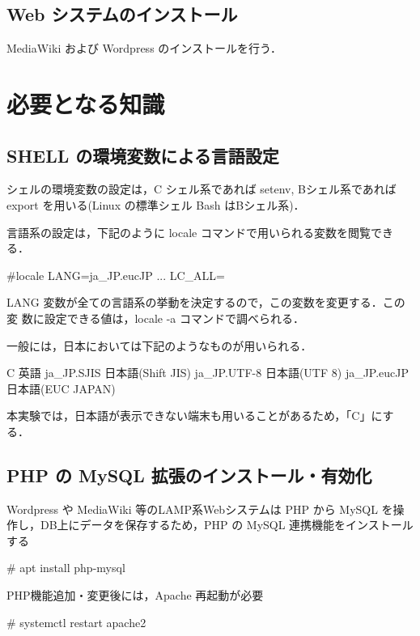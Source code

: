 \subsection*{Web システムのインストール}

MediaWiki および Wordpress のインストールを行う．


\clearpage
\section{必要となる知識}

\subsection{SHELL の環境変数による言語設定}

シェルの環境変数の設定は，C シェル系であれば setenv, Bシェル系であれば
export を用いる(Linux の標準シェル Bash はBシェル系)．

言語系の設定は，下記のように locale コマンドで用いられる変数を閲覧できる．

\begin{cli}
#locale
LANG=ja_JP.eucJP
  ...
LC_ALL=
\end{cli}

LANG 変数が全ての言語系の挙動を決定するので，この変数を変更する．この変
数に設定できる値は，locale -a コマンドで調べられる．

一般には，日本においては下記のようなものが用いられる．

\begin{cli}
C               英語
ja_JP.SJIS      日本語(Shift JIS)
ja_JP.UTF-8     日本語(UTF 8)
ja_JP.eucJP     日本語(EUC JAPAN)
\end{cli}

本実験では，日本語が表示できない端末も用いることがあるため，「C」にする．



\subsection{PHP の MySQL 拡張のインストール・有効化}

Wordpress や MediaWiki 等のLAMP系Webシステムは PHP から MySQL を操作し，DB上にデータを保存するため，PHP の MySQL 連携機能をインストールする

\begin{cli}
# apt install php-mysql

PHP機能追加・変更後には，Apache 再起動が必要

# systemctl restart apache2

\end{cli}

